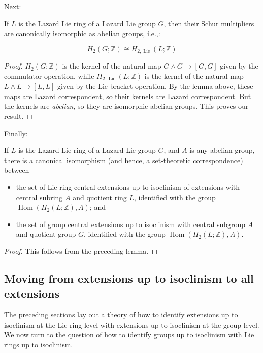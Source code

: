 Next:

\begin{lemma}
  If $L$ is the Lazard Lie ring of a Lazard Lie group $G$, then their
  Schur multipliers are canonically isomorphic as abelian groups,
  i.e.,:

  $$H_2(G;\mathbb{Z}) \cong H_{2,\operatorname{Lie}}(L;\mathbb{Z})$$
\end{lemma}

\begin{proof}
  $H_2(G;\mathbb{Z})$ is the kernel of the natural map $G \wedge G \to
  [G,G]$ given by the commutator operation, while
  $H_{2,\operatorname{Lie}}(L;\mathbb{Z})$ is the kernel of the
  natural map $L \wedge L \to [L,L]$ given by the Lie bracket
  operation. By the lemma above, these maps are Lazard correspondent,
  so their kernels are Lazard correspondent. But the kernels are {\em
    abelian}, so they are isomorphic abelian groups. This proves our
  result.
\end{proof}

Finally:

\begin{lemma}
  If $L$ is the Lazard Lie ring of a Lazard Lie group $G$, and $A$ is
  any abelian group, there is a canonical isomorphism (and hence, a
  set-theoretic correspondence) between 

  \begin{itemize} 
  \item the set of Lie ring central extensions up to isoclinism of
    extensions with central subring $A$ and quotient ring $L$,
    identified with the group
    $\operatorname{Hom}(H_2(L;\mathbb{Z}),A)$; and
  \item the set of group central extensions up to isoclinism with
    central subgroup $A$ and quotient group $G$, identified with the
    group $\operatorname{Hom}(H_2(L;\mathbb{Z}),A)$.
  \end{itemize}
\end{lemma}

\begin{proof}
  This follows from the preceding lemma.
\end{proof}

\subsection{Moving from extensions up to isoclinism to all extensions}

The preceding sections lay out a theory of how to identify extensions
up to isoclinism at the Lie ring level with extensions up to
isoclinism at the group level. We now turn to the question of how to
identify groups up to isoclinism with Lie rings up to isoclinism.

